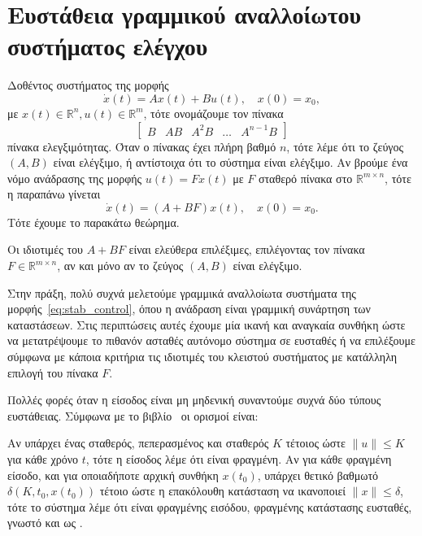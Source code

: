 \section{Ευστάθεια γραμμικού αναλλοίωτου συστήματος ελέγχου}
Δοθέντος συστήματος της μορφής
\begin{equation}\label{eq:stab_control}
    \dot{x}(t) = Ax(t) + Bu(t), \quad x(0) = x_0,
\end{equation}
με \( x(t) \in \mathbb{R}^n, u(t) \in \mathbb{R}^m \),
τότε ονομάζουμε τον πίνακα
\[
    \begin{bmatrix}
        B & AB & A^2B & \dots & A^{n - 1}B
    \end{bmatrix}
\]
πίνακα ελεγξιμότητας. Όταν ο πίνακας έχει πλήρη βαθμό \( n \), τότε λέμε ότι το
ζεύγος \( (A, B) \) είναι ελέγξιμο, ή αντίστοιχα ότι το σύστημα είναι ελέγξιμο.
Αν βρούμε ένα νόμο ανάδρασης της μορφής \( u(t) = Fx(t) \) με \( F \) σταθερό
πίνακα στο \( \mathbb{R}^{m \times n} \), τότε η παραπάνω γίνεται
\[
    \dot{x}(t) = (A + BF)x(t), \quad x(0) = x_0.
\]
Τότε έχουμε το παρακάτω θεώρημα.
\begin{theorem} 
    Οι ιδιοτιμές του \( A + BF \) είναι ελεύθερα επιλέξιμες, επιλέγοντας τον
    πίνακα \( F \in \mathbb{R}^{m \times n} \), αν και μόνο αν το ζεύγος \( (A,
    B) \) είναι ελέγξιμο.
\end{theorem}
Στην πράξη, πολύ συχνά μελετούμε γραμμικά αναλλοίωτα συστήματα της
μορφής~\eqref{eq:stab_control}, όπου η ανάδραση είναι γραμμική συνάρτηση
των καταστάσεων. Στις περιπτώσεις αυτές έχουμε μία ικανή και
αναγκαία συνθήκη ώστε να μετατρέψουμε το πιθανόν ασταθές αυτόνομο σύστημα σε
ευσταθές ή να επιλέξουμε σύμφωνα με κάποια κριτήρια τις ιδιοτιμές του κλειστού
συστήματος με κατάλληλη επιλογή του πίνακα \( F \).

Πολλές φορές όταν η είσοδος είναι μη μηδενική συναντούμε συχνά δύο τύπους
ευστάθειας. Σύμφωνα με το βιβλίο~\cite{brogan1991modern} οι ορισμοί είναι:

\begin{definition} 
    Αν υπάρχει ένας σταθερός, πεπερασμένος και σταθερός \( K \) τέτοιος ώστε
    \( \|u\| \leq K \) για κάθε χρόνο \( t \), τότε η είσοδος λέμε ότι είναι φραγμένη.
    Αν για κάθε φραγμένη είσοδο, και για οποιαδήποτε αρχική συνθήκη
    \( x(t_0) \), υπάρχει θετικό βαθμωτό \( \delta(K, t_0, x(t_0)) \) τέτοιο
    ώστε η επακόλουθη κατάσταση να ικανοποιεί \( \|x\| \leq \delta \), τότε το
    σύστημα λέμε ότι είναι φραγμένης εισόδου, φραγμένης κατάστασης ευσταθές, γνωστό και
    ως .
\end{definition}

